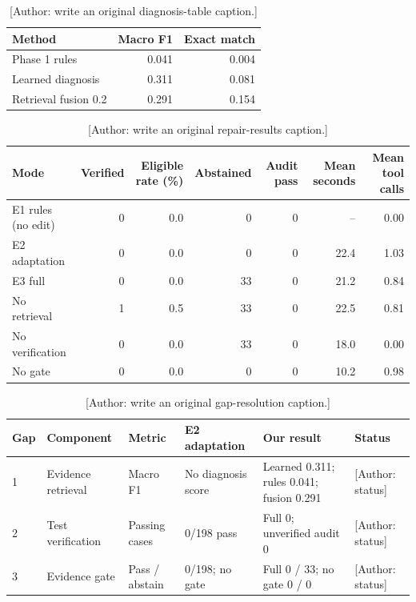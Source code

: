 \begin{table}[t]
\centering
\caption{[Author: write an original diagnosis-table caption.]}
\label{tab:diagnosis}
\begin{tabular}{lrr}
\toprule
Method & Macro F1 & Exact match \\
\midrule
Phase 1 rules & 0.041 & 0.004 \\
Learned diagnosis & 0.311 & 0.081 \\
Retrieval fusion 0.2 & 0.291 & 0.154 \\
\bottomrule
\end{tabular}
\end{table}

\begin{table}[t]
\centering
\caption{[Author: write an original repair-results caption.]}
\label{tab:repair}
\begin{tabular}{lrrrrrr}
\toprule
Mode & Verified & Eligible rate (\%) & Abstained & Audit pass & Mean seconds & Mean tool calls \\
\midrule
E1 rules (no edit) & 0 & 0.0 & 0 & 0 & -- & 0.00 \\
E2 adaptation & 0 & 0.0 & 0 & 0 & 22.4 & 1.03 \\
E3 full & 0 & 0.0 & 33 & 0 & 21.2 & 0.84 \\
No retrieval & 1 & 0.5 & 33 & 0 & 22.5 & 0.81 \\
No verification & 0 & 0.0 & 33 & 0 & 18.0 & 0.00 \\
No gate & 0 & 0.0 & 0 & 0 & 10.2 & 0.98 \\
\bottomrule
\end{tabular}
\end{table}

\begin{table}[t]
\centering
\caption{[Author: write an original gap-resolution caption.]}
\label{tab:gaps}
\begin{tabular}{p{0.5cm}p{2.6cm}p{2.0cm}p{2.1cm}p{4.5cm}p{1.0cm}}
\toprule
Gap & Component & Metric & E2 adaptation & Our result & Status \\
\midrule
1 & Evidence retrieval & Macro F1 & No diagnosis score & Learned 0.311; rules 0.041; fusion 0.291 & [Author: status] \\
2 & Test verification & Passing cases & 0/198 pass & Full 0; unverified audit 0 & [Author: status] \\
3 & Evidence gate & Pass / abstain & 0/198; no gate & Full 0 / 33; no gate 0 / 0 & [Author: status] \\
\bottomrule
\end{tabular}
\end{table}
